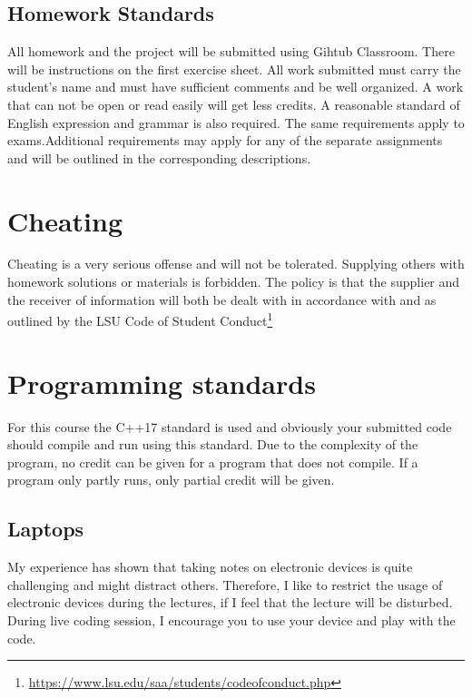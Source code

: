 \documentclass[11pt,letterpaper]{article}
\begin{document}
\subsection*{Homework Standards}
All homework and the project will be submitted using Gihtub Classroom. There will be instructions on the first exercise sheet. All work submitted must carry the student's name and must have sufficient comments and be well organized. A work that can not be open or read easily will get less credits.  A  reasonable standard  of  English  expression  and  grammar  is  also  required.  The  same  requirements  apply  to  exams.Additional requirements   may   apply   for   any   of   the   separate   assignments   and   will   be   outlined   in   the   corresponding descriptions.
 
\section{Cheating}
Cheating is a very serious offense and will not be tolerated. Supplying others with homework solutions or materials is forbidden. The  policy  is  that  the supplier and the receiver of information will both be dealt with in accordance with and as outlined by the LSU Code of Student Conduct\footnote{\url{https://www.lsu.edu/saa/students/codeofconduct.php}}

\section*{Programming standards}
For this course the C++17 standard is used and obviously your submitted code should compile and run using this standard. Due to the complexity of the program, no credit can be given for a program that does not compile. If a program only partly runs, only partial credit will be given.

\subsection*{Laptops}
My experience has shown that taking notes on electronic devices is quite challenging and might distract others. Therefore, I like to restrict the usage of electronic devices during the lectures, if I feel that the lecture will be disturbed. During live coding session, I encourage you to use your device and play with the code.

\doclicenseThis
\end{document}
